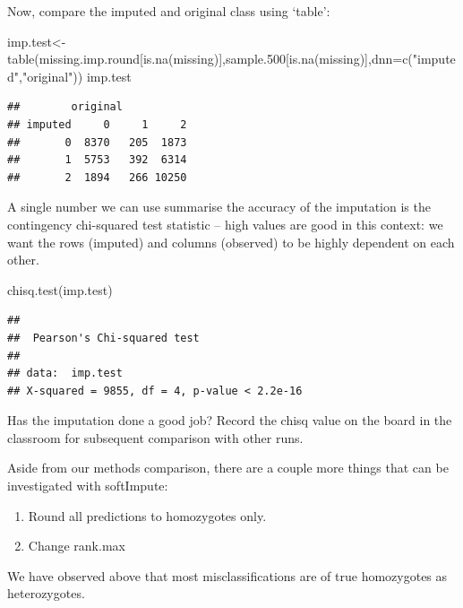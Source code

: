 \documentclass[
]{book}
\newenvironment{Shaded}{\begin{snugshade}}{\end{snugshade}}
\newcommand{\AttributeTok}[1]{\textcolor[rgb]{0.77,0.63,0.00}{#1}}
\newcommand{\FloatTok}[1]{\textcolor[rgb]{0.00,0.00,0.81}{#1}}
\newcommand{\FunctionTok}[1]{\textcolor[rgb]{0.00,0.00,0.00}{#1}}
\newcommand{\NormalTok}[1]{#1}
\newcommand{\OtherTok}[1]{\textcolor[rgb]{0.56,0.35,0.01}{#1}}
\newcommand{\StringTok}[1]{\textcolor[rgb]{0.31,0.60,0.02}{#1}}
\providecommand{\tightlist}{%
  \setlength{\itemsep}{0pt}\setlength{\parskip}{0pt}}
\begin{document}
Now, compare the imputed and original class using `table':

\begin{Shaded}
\begin{Highlighting}[]
\NormalTok{imp.test}\OtherTok{\textless{}{-}}\FunctionTok{table}\NormalTok{(missing.imp.round[}\FunctionTok{is.na}\NormalTok{(missing)],sample}\FloatTok{.500}\NormalTok{[}\FunctionTok{is.na}\NormalTok{(missing)],}\AttributeTok{dnn=}\FunctionTok{c}\NormalTok{(}\StringTok{"imputed"}\NormalTok{,}\StringTok{"original"}\NormalTok{))}
\NormalTok{imp.test}
\end{Highlighting}
\end{Shaded}

\begin{verbatim}
##        original
## imputed     0     1     2
##       0  8370   205  1873
##       1  5753   392  6314
##       2  1894   266 10250
\end{verbatim}

A single number we can use summarise the accuracy of the imputation is the contingency chi-squared test statistic -- high values are good in this context: we want the rows (imputed) and columns (observed) to be highly dependent on each other.

\begin{Shaded}
\begin{Highlighting}[]
\FunctionTok{chisq.test}\NormalTok{(imp.test) }
\end{Highlighting}
\end{Shaded}

\begin{verbatim}
## 
##  Pearson's Chi-squared test
## 
## data:  imp.test
## X-squared = 9855, df = 4, p-value < 2.2e-16
\end{verbatim}

Has the imputation done a good job? Record the chisq value on the board in the classroom for subsequent comparison with other runs.

Aside from our methods comparison, there are a couple more things that can be investigated with softImpute:

\begin{enumerate}
\def\labelenumi{\alph{enumi})}
\tightlist
\item
  Round all predictions to homozygotes only.
\item
  Change rank.max
\end{enumerate}

We have observed above that most misclassifications are of true homozygotes as heterozygotes.
\end{document}
